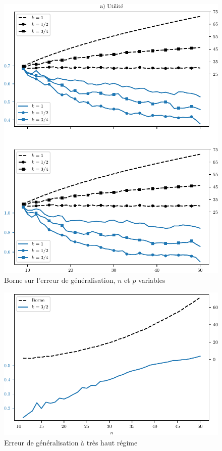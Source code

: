 \begin{figure}[h]
  \centering
  \includegraphics[width=\textwidth]{../../experiments/fig/np_genbound.pdf}
  \caption[à faire]{Borne sur l'erreur de généralisation, $n$ et $p$ variables}
  \label{fig_np_genbound}
\end{figure}

\begin{figure}[h]
  \centering
  \includegraphics[width=\textwidth]{../../experiments/fig/np_gen32.pdf}
  \caption{Erreur de généralisation à très haut régime}
  \label{fig_np_gen32}
\end{figure}

